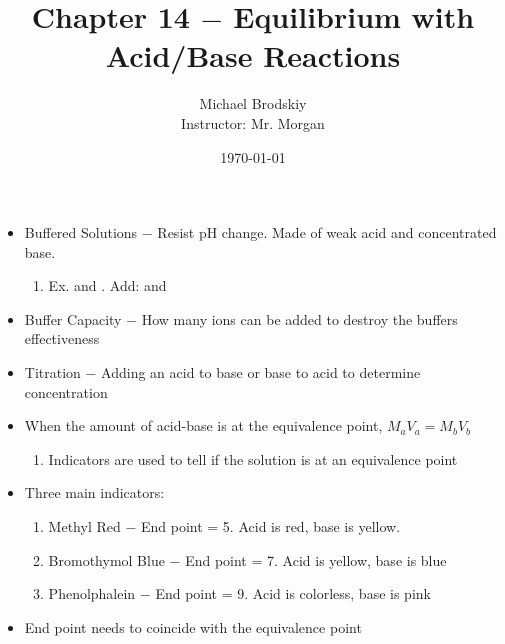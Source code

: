 \documentclass[12pt]{article}
\title{Chapter 14 $-$ Equilibrium with Acid/Base Reactions}
\date{\today}
\author{Michael Brodskiy\\ \small Instructor: Mr. Morgan}
\begin{document}
\maketitle

\begin{itemize}

  \item Buffered Solutions $-$ Resist pH change. Made of weak acid and concentrated base.

    \begin{enumerate}

      \item  Ex.  and . Add:  and 

    \end{enumerate}

  \item Buffer Capacity $-$ How many ions can be added to destroy the buffers effectiveness

  \item Titration $-$ Adding an acid to base or base to acid to determine concentration

  \item When the amount of acid-base is at the equivalence point, $M_aV_a=M_bV_b$

    \begin{enumerate}

      \item Indicators are used to tell if the solution is at an equivalence point

    \end{enumerate}

  \item Three main indicators:
    
    \begin{enumerate}

      \item Methyl Red $-$ End point = 5. Acid is red, base is yellow.
        
      \item Bromothymol Blue $-$ End point = 7. Acid is yellow, base is blue

      \item Phenolphalein $-$ End point = 9. Acid is colorless, base is pink

    \end{enumerate}

  \item End point needs to coincide with the equivalence point


\end{itemize}
\end{document}
